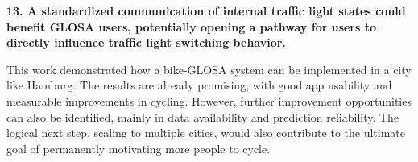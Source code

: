 \textbf{\color{cidarkblue}13. A standardized communication of internal traffic light states could benefit GLOSA users, potentially opening a pathway for users to directly influence traffic light switching behavior.}

This work demonstrated how a bike-GLOSA system can be implemented in a city like Hamburg. The results are already promising, with good app usability and measurable improvements in cycling. However, further improvement opportunities can also be identified, mainly in data availability and prediction reliability. The logical next step, scaling to multiple cities, would also contribute to the ultimate goal of permanently motivating more people to cycle.